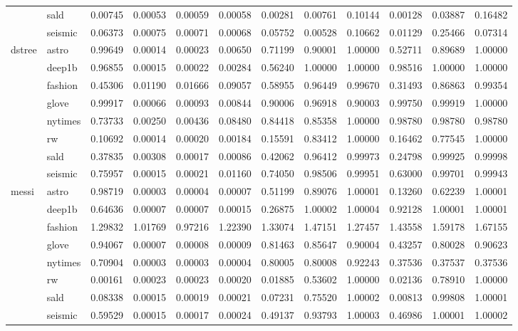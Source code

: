 \begin{tabular}{ll|r|rrr|rrr|rrr}
 & sald & 0.00745 & 0.00053 & 0.00059 & 0.00058 & 0.00281 & 0.00761 & 0.10144 & 0.00128 & 0.03887 & 0.16482 \\
 & seismic & 0.06373 & 0.00075 & 0.00071 & 0.00068 & 0.05752 & 0.00528 & 0.10662 & 0.01129 & 0.25466 & 0.07314 \\
\cline{1-12}
\multirow[t]{8}{*}{dstree} & astro & 0.99649 & 0.00014 & 0.00023 & 0.00650 & 0.71199 & 0.90001 & 1.00000 & 0.52711 & 0.89689 & 1.00000 \\
 & deep1b & 0.96855 & 0.00015 & 0.00022 & 0.00284 & 0.56240 & 1.00000 & 1.00000 & 0.98516 & 1.00000 & 1.00000 \\
 & fashion & 0.45306 & 0.01190 & 0.01666 & 0.09057 & 0.58955 & 0.96449 & 0.99670 & 0.31493 & 0.86863 & 0.99354 \\
 & glove & 0.99917 & 0.00066 & 0.00093 & 0.00844 & 0.90006 & 0.96918 & 0.90003 & 0.99750 & 0.99919 & 1.00000 \\
 & nytimes & 0.73733 & 0.00250 & 0.00436 & 0.08480 & 0.84418 & 0.85358 & 1.00000 & 0.98780 & 0.98780 & 0.98780 \\
 & rw & 0.10692 & 0.00014 & 0.00020 & 0.00184 & 0.15591 & 0.83412 & 1.00000 & 0.16462 & 0.77545 & 1.00000 \\
 & sald & 0.37835 & 0.00308 & 0.00017 & 0.00086 & 0.42062 & 0.96412 & 0.99973 & 0.24798 & 0.99925 & 0.99998 \\
 & seismic & 0.75957 & 0.00015 & 0.00021 & 0.01160 & 0.74050 & 0.98506 & 0.99951 & 0.63000 & 0.99701 & 0.99943 \\
\cline{1-12}
\multirow[t]{8}{*}{messi} & astro & 0.98719 & 0.00003 & 0.00004 & 0.00007 & 0.51199 & 0.89076 & 1.00001 & 0.13260 & 0.62239 & 1.00001 \\
 & deep1b & 0.64636 & 0.00007 & 0.00007 & 0.00015 & 0.26875 & 1.00002 & 1.00004 & 0.92128 & 1.00001 & 1.00001 \\
 & fashion & 1.29832 & 1.01769 & 0.97216 & 1.22390 & 1.33074 & 1.47151 & 1.27457 & 1.43558 & 1.59178 & 1.67155 \\
 & glove & 0.94067 & 0.00007 & 0.00008 & 0.00009 & 0.81463 & 0.85647 & 0.90004 & 0.43257 & 0.80028 & 0.90623 \\
 & nytimes & 0.70904 & 0.00003 & 0.00003 & 0.00004 & 0.80005 & 0.80008 & 0.92243 & 0.37536 & 0.37537 & 0.37536 \\
 & rw & 0.00161 & 0.00023 & 0.00023 & 0.00020 & 0.01885 & 0.53602 & 1.00000 & 0.02136 & 0.78910 & 1.00000 \\
 & sald & 0.08338 & 0.00015 & 0.00019 & 0.00021 & 0.07231 & 0.75520 & 1.00002 & 0.00813 & 0.99808 & 1.00001 \\
 & seismic & 0.59529 & 0.00015 & 0.00017 & 0.00024 & 0.49137 & 0.93793 & 1.00003 & 0.46986 & 1.00001 & 1.00002 \\
\cline{1-12}
\bottomrule
\end{tabular}
